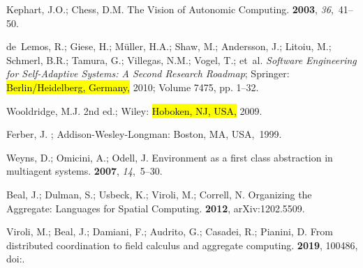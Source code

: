 \documentclass[jsan,article,accept,moreauthors,pdftex]{Definitions/mdpi}
\begin{document}
\begin{thebibliography}{999}

Kephart, J.O.; Chess, D.M.
\newblock The Vision of Autonomic Computing.
 {\bf 2003}, {\em 36},~41--50.

de~Lemos, R.; Giese, H.; M{\"{u}}ller, H.A.; Shaw, M.; Andersson, J.; Litoiu,
  M.; Schmerl, B.R.; Tamura, G.; Villegas, N.M.; Vogel, T.; \mbox{et al}.
\newblock \emph{Software Engineering for Self-Adaptive Systems: {A} Second Research
  Roadmap};
\newblock   Springer:  \hl{Berlin/Heidelberg, Germany,} %
  2010;
  Volume 7475, pp. 1--32.

Wooldridge, M.J.
  2nd ed.; Wiley:  \hl{Hoboken, NJ, USA,} %
 2009.

Ferber, J.
; Addison-Wesley-Longman: Boston, MA, USA,~1999.

Weyns, D.; Omicini, A.; Odell, J.
\newblock Environment as a first class abstraction in multiagent systems.
 {\bf 2007}, {\em 14},~5--30.

Beal, J.; Dulman, S.; Usbeck, K.; Viroli, M.; Correll, N.
\newblock Organizing the Aggregate: Languages for Spatial Computing.
 {\bf 2012}, arXiv:1202.5509.

Viroli, M.; Beal, J.; Damiani, F.; Audrito, G.; Casadei, R.; Pianini, D.
\newblock From distributed coordination to field calculus and aggregate
  computing.
 {\bf 2019}, 100486,
\newblock
  doi:{\href{https://doi.org/Https://Doi.Org/10.1016/J.Jlamp.2019.100486}{}}.


\end{thebibliography}
\end{document}
